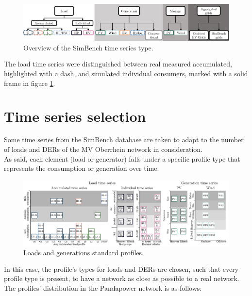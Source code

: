 \begin{figure}[h]
\centering
    \includegraphics[width=.95\linewidth]{images/MVOberr/SimBench time series types.PNG}
\caption[SimBench time series type]{Overview of the SimBench time series type.}
\label{fig:SBtimeseriestype}
\end{figure}

The load time series were distinguished between real measured accumulated, highlighted with a dash, and simulated individual consumers, marked with a solid frame in figure \ref{fig:SBtimeseriestype}. \\



\section{Time series selection}
\label{sec:3tss}
Some time series from the SimBench database are taken to adapt to the number of loads and \glspl{DER} of the MV Oberrhein network in consideration. \\

As said, each element (load or generator) falls under a specific profile type that represents the consumption or generation over time.

\begin{figure}[H]
\centering
    \includegraphics[width=.95\linewidth]{images/MVOberr/SimBench load and generation time series.PNG}
\caption[SimBench loads and generations standard profiles]{Loads and generations standard profiles.}
\end{figure}

In this case, the profile's types for loads and \glspl{DER} are chosen, such that every profile type is present, to have a network as close as possible to a real network. \\
The profiles' distribution in the Pandapower network is as follows:

